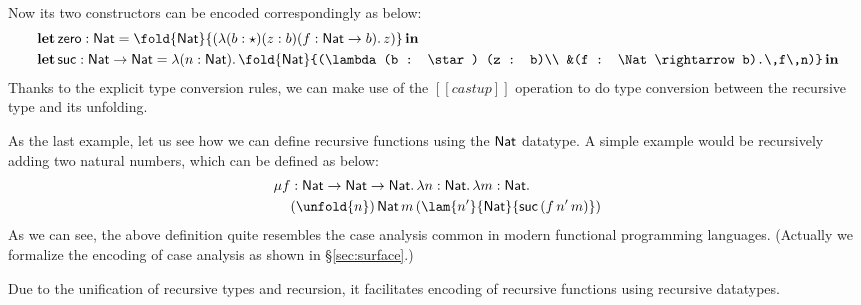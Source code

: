 Now its two constructors can be encoded correspondingly as below:
\begin{align*}
  \letbb\,&\zero : \Nat = \fold{\Nat}{(\lambda (b : \star) (z : b) (f : \Nat \rightarrow b).\,z)}\,\inb \\
  \letbb\,&\suc : \Nat \rightarrow \Nat = \lambda (n : \Nat).\,\fold{\Nat}{(\lambda (b : \star) (z : b)\\ &(f : \Nat \rightarrow b).\,f\,n)}\,\inb
\end{align*}
Thanks to the explicit type conversion rules, we can make use of the $[[castup]]$ operation to do type conversion between the recursive type and its unfolding.

As the last example, let us see how we can define recursive functions using the $\mathsf{Nat}$ datatype. A simple example would be recursively adding two natural numbers, which can be defined as below:
\begin{align*}
  \mu f &: \Nat \rightarrow \Nat \rightarrow \Nat.\,\lambda n : \Nat.\,\lambda m : \Nat.\\
  &(\unfold{n})\,\Nat\,m\,(\lam{n'}{\Nat}{\suc\,(f\,n'\,m)})
\end{align*}
As we can see, the above definition quite resembles the case analysis common in modern functional programming languages. (Actually we formalize the encoding of case analysis as shown in \S\ref{sec:surface}.)

Due to the unification of recursive types and recursion, it facilitates encoding of recursive functions using recursive datatypes.

